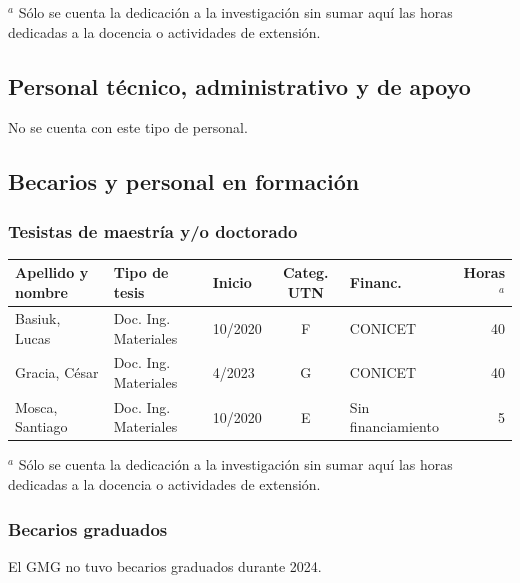\documentclass[a4paper,11pt,twoside,final,titlepage,onecolumn,openright]{report}
\begin{document}
\normalsize
\vspace{0.5cm}
$^a$ Sólo se cuenta la dedicación a la investigación sin sumar aquí las horas dedicadas a la docencia o actividades de extensión.


\subsection{Personal técnico, administrativo y de apoyo}
No se cuenta con este tipo de personal.


\subsection{Becarios y personal en formación}

\subsubsection{Tesistas de maestría y/o doctorado}
\begin{tabular}{l l l c l r}
	\toprule
	Apellido y nombre & Tipo de tesis        & Inicio  & Categ. UTN & Financ.            & Horas$^a$ \\
	\midrule
	Basiuk, Lucas     & Doc. Ing. Materiales & 10/2020 & F          & CONICET            & 40        \\
	Gracia, César     & Doc. Ing. Materiales & 4/2023  & G          & CONICET            & 40        \\
	Mosca, Santiago   & Doc. Ing. Materiales & 10/2020 & E          & Sin financiamiento & 5         \\
	\bottomrule
\end{tabular}

\normalsize
\vspace{0.5cm}
$^a$ Sólo se cuenta la dedicación a la investigación sin sumar aquí las horas dedicadas a la docencia o actividades de extensión.


\subsubsection{Becarios graduados}

El GMG no tuvo becarios graduados durante 2024.
%
\end{document}
